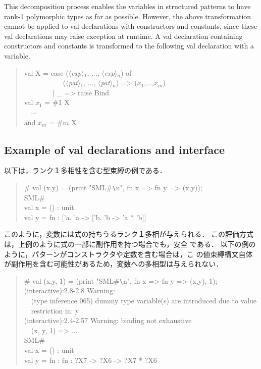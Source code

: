 \documentclass{jbook}
\newcommand{\txt}[2]{#2}
\newcommand{\nonterm}[1]{\mbox{$\langle$}{\it #1}\mbox{$\rangle$}}
\newcommand{\myem}{\mbox{\ \ }}
\newenvironment{program}{\begin{quote}\begin{tt}}%
                        {\end{tt}\end{quote}}
\begin{document}
	This decomposition process enables the variables in structured
patterns to have rank-1 polymorphic types as far as possible.
	However, the above transformation cannot be applied
to val declarations with constructors and constants, since these val
declarations may raise exception at runtime.
	A val declaration containing constructors and constants is 
transformed to the following val declaration with a variable.
\begin{program}
  val X = case (\nonterm{exp}$_1$, $\ldots$, \nonterm{exp}$_n$) of\\
  \myem\myem\myem\myem\ \ \ (\nonterm{pat}$_1$, $\ldots$, \nonterm{pat}$_n$) => ($x_1$,$\ldots$,$x_m$)\\
  \myem\myem\myem\myem | \_ => raise Bind\\
  val $x_1$ = \#1 X\\
  \myem $\cdots$\\
  and $x_m$ = \#$m$ X
\end{program}
\fi%

\subsection{\txt{val宣言とインタフェイスの例}{Example of val declarations and interface}}
\label{sec:valuBindings:examples}
\ifjp%

	以下は，ランク１多相性を含む型束縛の例である．
\begin{program}
  \# val (x,y) = (print "SML\#\verb|\|n", fn x => fn y => (x,y));\\
  SML\#\\
  val x = () : unit\\
  val y = fn : ['a. 'a -> ['b. 'b -> 'a * 'b]]
\end{program}
	このように，変数には式の持ちうるランク１多相が与えられる．
	この評価方式は，上例のように式の一部に副作用を持つ場合でも，安全
である．
	以下の例のように，パターンがコンストラクタや定数を含む場合は，こ
の値束縛構文自体が副作用を含む可能性があるため，変数への多相型は与えられない．
\begin{program}
  \# val (x,y, 1) = (print "SML\#\verb|\|n", fn x => fn y => (x,y), 1);\\
  (interactive):2.8-2.8 Warning:\\
  \myem (type inference 065) dummy type variable(s) are introduced due to value\\
  \myem restriction in: y\\
  (interactive):2.4-2.57 Warning: binding not exhaustive\\
  \myem  (x, y, 1) => ...\\
  SML\#\\
  val x = () : unit\\
  val y = fn : fn : ?X7 -> ?X6 -> ?X7 * ?X6
\end{program}
\end{document}
